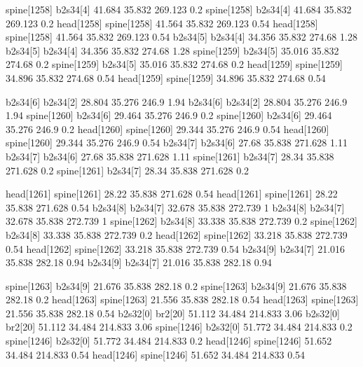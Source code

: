 spine[1258]    b2s34[4]    41.684    35.832    269.123    0.2
spine[1258]    b2s34[4]    41.684    35.832    269.123    0.2
head[1258]    spine[1258]    41.564    35.832    269.123    0.54
head[1258]    spine[1258]    41.564    35.832    269.123    0.54
b2s34[5]    b2s34[4]    34.356    35.832    274.68    1.28
b2s34[5]    b2s34[4]    34.356    35.832    274.68    1.28
spine[1259]    b2s34[5]    35.016    35.832    274.68    0.2
spine[1259]    b2s34[5]    35.016    35.832    274.68    0.2
head[1259]    spine[1259]    34.896    35.832    274.68    0.54
head[1259]    spine[1259]    34.896    35.832    274.68    0.54


b2s34[6]    b2s34[2]    28.804    35.276    246.9    1.94
b2s34[6]    b2s34[2]    28.804    35.276    246.9    1.94
spine[1260]    b2s34[6]    29.464    35.276    246.9    0.2
spine[1260]    b2s34[6]    29.464    35.276    246.9    0.2
head[1260]    spine[1260]    29.344    35.276    246.9    0.54
head[1260]    spine[1260]    29.344    35.276    246.9    0.54
b2s34[7]    b2s34[6]    27.68    35.838    271.628    1.11
b2s34[7]    b2s34[6]    27.68    35.838    271.628    1.11
spine[1261]    b2s34[7]    28.34    35.838    271.628    0.2
spine[1261]    b2s34[7]    28.34    35.838    271.628    0.2


head[1261]    spine[1261]    28.22    35.838    271.628    0.54
head[1261]    spine[1261]    28.22    35.838    271.628    0.54
b2s34[8]    b2s34[7]    32.678    35.838    272.739    1
b2s34[8]    b2s34[7]    32.678    35.838    272.739    1
spine[1262]    b2s34[8]    33.338    35.838    272.739    0.2
spine[1262]    b2s34[8]    33.338    35.838    272.739    0.2
head[1262]    spine[1262]    33.218    35.838    272.739    0.54
head[1262]    spine[1262]    33.218    35.838    272.739    0.54
b2s34[9]    b2s34[7]    21.016    35.838    282.18    0.94
b2s34[9]    b2s34[7]    21.016    35.838    282.18    0.94


spine[1263]    b2s34[9]    21.676    35.838    282.18    0.2
spine[1263]    b2s34[9]    21.676    35.838    282.18    0.2
head[1263]    spine[1263]    21.556    35.838    282.18    0.54
head[1263]    spine[1263]    21.556    35.838    282.18    0.54
b2s32[0]    br2[20]    51.112    34.484    214.833    3.06
b2s32[0]    br2[20]    51.112    34.484    214.833    3.06
spine[1246]    b2s32[0]    51.772    34.484    214.833    0.2
spine[1246]    b2s32[0]    51.772    34.484    214.833    0.2
head[1246]    spine[1246]    51.652    34.484    214.833    0.54
head[1246]    spine[1246]    51.652    34.484    214.833    0.54


